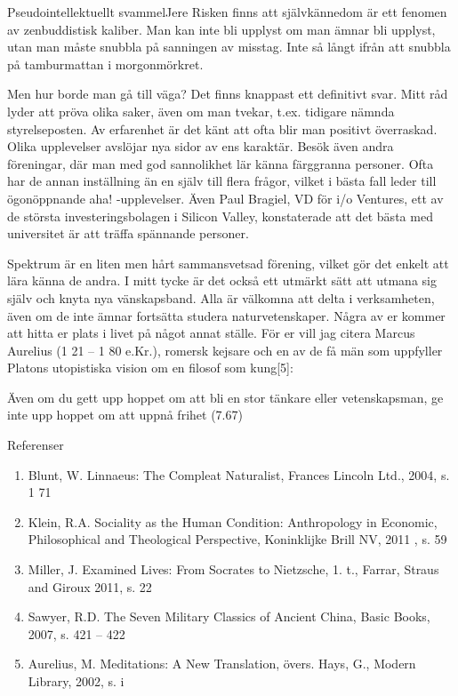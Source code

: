 \documentclass{spektraklet}
\begin{document}
\begin{artikel}{Pseudointellektuellt svammel}{Jere}
Risken finns att självkännedom är ett fenomen av zenbuddistisk kaliber. Man kan inte bli upplyst om man ämnar bli upplyst, utan man måste snubbla på sanningen av misstag. Inte så långt ifrån att snubbla på tamburmattan i morgonmörkret.

Men hur borde man gå till väga? Det finns knappast ett definitivt svar. Mitt råd lyder att pröva olika saker, även om man tvekar, t.ex. tidigare nämnda styrelseposten. Av erfarenhet är det känt att ofta blir man positivt överraskad. Olika upplevelser avslöjar nya sidor av ens karaktär. Besök även andra föreningar, där man med god sannolikhet lär känna färggranna personer. Ofta har de annan inställning än en själv till flera frågor, vilket i bästa fall leder till ögonöppnande aha! -upplevelser. Även Paul Bragiel, VD för i/o Ventures, ett av de största investeringsbolagen i Silicon Valley, konstaterade att det bästa med universitet är att träffa spännande personer.

Spektrum är en liten men hårt sammansvetsad förening, vilket gör det enkelt att lära känna de andra. I mitt tycke är det också ett utmärkt sätt att utmana sig själv och knyta nya vänskapsband. Alla är välkomna att delta i verksamheten, även om de inte ämnar fortsätta studera naturvetenskaper. Några av er kommer att hitta er plats i livet på något annat ställe. För er vill jag citera Marcus Aurelius (1 21 – 1 80 e.Kr.), romersk kejsare och en av de få män som uppfyller Platons utopistiska vision om en filosof som kung[5]: 

Även om du gett upp hoppet om att bli en stor tänkare eller vetenskapsman, ge inte upp hoppet om att uppnå frihet (7.67)

Referenser
\begin{enumerate}
\item Blunt, W. Linnaeus: The Compleat Naturalist, Frances Lincoln Ltd., 2004, s. 1 71

\item Klein, R.A. Sociality as the Human Condition: Anthropology in Economic, Philosophical and Theological Perspective, Koninklijke Brill NV, 2011 , s. 59

\item Miller, J. Examined Lives: From Socrates to Nietzsche, 1. t., Farrar, Straus and Giroux 2011, s. 22

\item Sawyer, R.D. The Seven Military Classics of Ancient China, Basic Books, 2007, s. 421 – 422

\item Aurelius, M. Meditations: A New Translation, övers. Hays, G., Modern Library, 2002, s. i
\end{enumerate}
\end{artikel}
\end{document}
